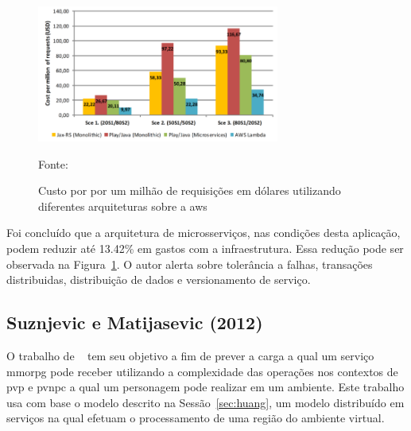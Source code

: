 \begin{figure}[htb!]
\caption{Custo por por um milhão de requisições em dólares utilizando diferentes arquiteturas sobre a \ac{aws}}
\label{fig:custo_aws}
\includegraphics[height=4.5cm]{img/cap2/custo_aws.png}
\centering

Fonte:~\cite{7515686}
\end{figure}



Foi concluído que a arquitetura de microsserviços, nas condições desta aplicação, podem reduzir até 13.42\% em gastos com a infraestrutura.
%
Essa redução pode ser observada na Figura~\ref{fig:custo_aws}.
%
O autor alerta sobre tolerância a falhas, transações distribuidas, distribuição de dados e versionamento de serviço.


\subsection{Suznjevic e Matijasevic (2012)}



O trabalho de ~\cite{6374456} tem seu objetivo a fim de prever a carga a qual um serviço \ac{mmorpg} pode receber utilizando a complexidade das operações nos contextos de \ac{pvp} e \ac{pvnpc} a qual um personagem pode realizar em um ambiente.
%
Este trabalho usa com base o modelo descrito na Sessão~\ref{sec:huang}, um modelo distribuído em serviços na qual efetuam o processamento de uma região do ambiente virtual.



